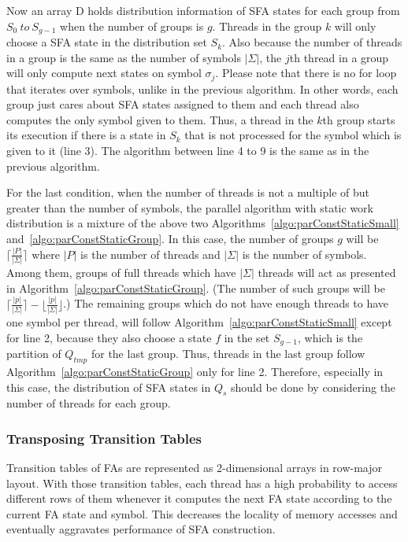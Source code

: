 \documentclass[10pt, conference, compsocconf]{IEEEtran}
\newcommand\StateSet[1][{}]{\ensuremath{Q_{#1}}}
\begin{document}
Now an array D holds distribution information of SFA states for each group
from $S_0~to~S_{g-1}$ when the number of groups is $g$. Threads in the group
$k$ will only choose a SFA state in the distribution set $S_k$. Also because
the number of threads in a group is the same as the number of symbols $|\Sigma|$,
the $j$th thread in a group will only compute next states on symbol $\sigma_j$.
Please note that there is no for loop that iterates over symbols, unlike in the 
previous algorithm. In other words, each group just cares about SFA
states assigned to them and each thread also computes the only symbol given to
them. Thus, a thread in the $k$th group starts its execution if there is a state
in $S_k$ that is not processed for the symbol which is given to it (line 3).
The algorithm between line 4 to 9 is the same as in the previous algorithm.

For the last condition, when the number of threads is not a multiple of but
greater than the number of symbols, the parallel algorithm with static work
distribution is a mixture of the above two Algorithms~\ref{algo:parConstStaticSmall}
and~\ref{algo:parConstStaticGroup}. In this case, the number of groups $g$ will be
$\lceil\frac{|P|}{|\Sigma|}\rceil$ where $|P|$ is the number of threads
and $|\Sigma|$ is the number of symbols. Among them, groups of
full threads which have $|\Sigma|$ threads will act as
presented in Algorithm~\ref{algo:parConstStaticGroup}. (The number of
such groups will be
$\big\lceil\frac{|p|}{|\Sigma|}\big\rceil-\big\lfloor\frac{|p|}{|\Sigma|}\big\rfloor$.)
The remaining groups which do not have enough threads to
have one symbol per thread, will follow Algorithm~\ref{algo:parConstStaticSmall}
except for line 2, because they also choose a state $f$ in the set $S_{g-1}$,
which is the partition of $\StateSet[tmp]$ for the last group.
Thus, threads in the last group follow Algorithm~\ref{algo:parConstStaticGroup} only for
line 2. Therefore, especially in this case, the distribution of SFA states
in $\StateSet[s]$ should be done by considering the number of threads for each group.

\subsubsection{Transposing Transition Tables}
\label{subsubsec:Transposition}
Transition tables of FAs are represented as 2-dimensional arrays
in row-major layout.  With those
transition tables, each thread has a high probability to access different rows
of them whenever it computes the next FA state according to the current FA
state and symbol. This decreases the locality of memory accesses and
eventually aggravates performance of SFA construction.
\end{document}
